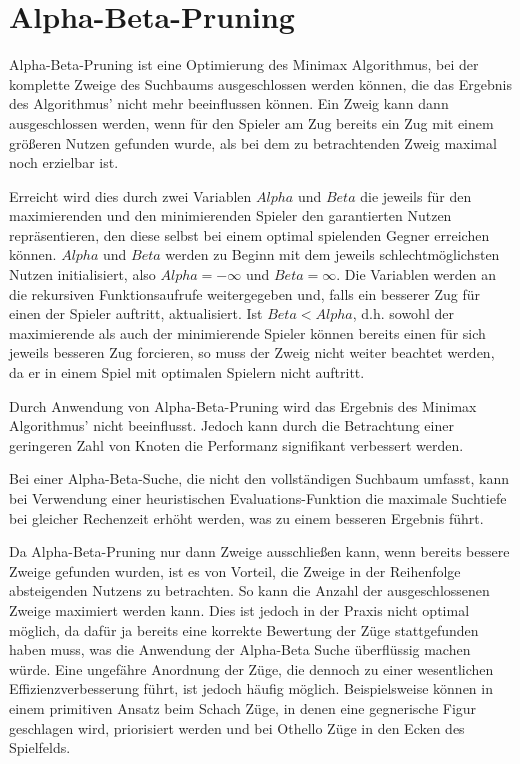 \section{Alpha-Beta-Pruning}

Alpha-Beta-Pruning ist eine Optimierung des Minimax Algorithmus, bei der komplette Zweige des Suchbaums ausgeschlossen werden können, die das Ergebnis des Algorithmus' nicht mehr beeinflussen können.
Ein Zweig kann dann ausgeschlossen werden, wenn für den Spieler am Zug bereits ein Zug mit einem größeren Nutzen gefunden wurde, als bei dem zu betrachtenden Zweig maximal noch erzielbar ist.

Erreicht wird dies durch zwei Variablen $Alpha$ und $Beta$ die jeweils für den maximierenden und den minimierenden Spieler den garantierten Nutzen repräsentieren, den diese selbst bei einem optimal spielenden Gegner erreichen können.
$Alpha$ und $Beta$ werden zu Beginn mit dem jeweils schlechtmöglichsten Nutzen initialisiert, also $Alpha = -\infty$ und $Beta = \infty$.
Die Variablen werden an die rekursiven Funktionsaufrufe weitergegeben und, falls ein besserer Zug für einen der Spieler auftritt, aktualisiert.
Ist $Beta < Alpha$, d.h. sowohl der maximierende als auch der minimierende Spieler können bereits einen für sich jeweils besseren Zug forcieren, so muss der Zweig nicht weiter beachtet werden, da er in einem Spiel mit optimalen Spielern nicht auftritt.

Durch Anwendung von Alpha-Beta-Pruning wird das Ergebnis des Minimax Algorithmus' nicht beeinflusst.
Jedoch kann durch die Betrachtung einer geringeren Zahl von Knoten die Performanz signifikant verbessert werden.

Bei einer Alpha-Beta-Suche, die nicht den vollständigen Suchbaum umfasst, kann bei Verwendung einer heuristischen Evaluations-Funktion die maximale Suchtiefe bei gleicher Rechenzeit erhöht werden, was zu einem besseren Ergebnis führt.

Da Alpha-Beta-Pruning nur dann Zweige ausschließen kann, wenn bereits bessere Zweige gefunden wurden, ist es von Vorteil, die Zweige in der Reihenfolge absteigenden Nutzens zu betrachten.
So kann die Anzahl der ausgeschlossenen Zweige maximiert werden kann.
Dies ist jedoch in der Praxis nicht optimal möglich, da dafür ja bereits eine korrekte Bewertung der Züge stattgefunden haben muss, was die Anwendung der Alpha-Beta Suche überflüssig machen würde.
Eine ungefähre Anordnung der Züge, die dennoch zu einer wesentlichen Effizienzverbesserung führt, ist jedoch häufig möglich.
Beispielsweise können in einem primitiven Ansatz beim Schach Züge, in denen eine gegnerische Figur geschlagen wird, priorisiert werden und bei Othello Züge in den Ecken des Spielfelds.

